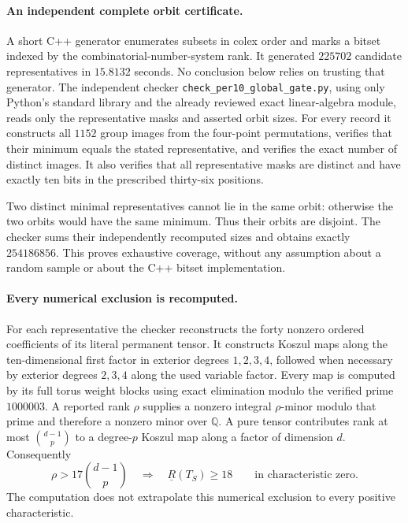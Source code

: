 \paragraph{An independent complete orbit certificate.}
A short C++ generator enumerates subsets in colex order and marks a
bitset indexed by the combinatorial-number-system rank.  It generated
$225702$ candidate representatives in $15.8132$ seconds.  No conclusion
below relies on trusting that generator.  The independent checker
\texttt{check\_per10\_global\_gate.py}, using only Python's standard
library and the already reviewed exact linear-algebra module, reads
only the representative masks and asserted orbit sizes.  For every
record it constructs all $1152$ group images from the four-point
permutations, verifies that their minimum equals the stated
representative, and verifies the exact number of distinct images.
It also verifies that all representative masks are distinct and have
exactly ten bits in the prescribed thirty-six positions.

Two distinct minimal representatives cannot lie in the same orbit:
otherwise the two orbits would have the same minimum.  Thus their
orbits are disjoint.  The checker sums their independently recomputed
sizes and obtains exactly $254186856$.  This proves exhaustive
coverage, without any assumption about a random sample or about the
C++ bitset implementation.

\paragraph{Every numerical exclusion is recomputed.}
For each representative the checker reconstructs the forty nonzero
ordered coefficients of its literal permanent tensor.  It constructs
Koszul maps along the ten-dimensional first factor in exterior degrees
$1,2,3,4$, followed when necessary by exterior degrees $2,3,4$ along
the used variable factor.  Every map is computed by its full torus
weight blocks using exact elimination modulo the verified prime
$1000003$.  A reported rank $\rho$ supplies a nonzero integral
$\rho$-minor modulo that prime and therefore a nonzero minor over
$\mathbb Q$.  A pure tensor contributes rank at most
$\binom{d-1}{p}$ to a degree-$p$ Koszul map along a factor of dimension
$d$.  Consequently
\[
 \rho>17\binom{d-1}{p}
 \quad\Longrightarrow\quad \underline R(T_S)\ge18
 \qquad\text{in characteristic zero}.
\]
The computation does not extrapolate this numerical exclusion to every
positive characteristic.


